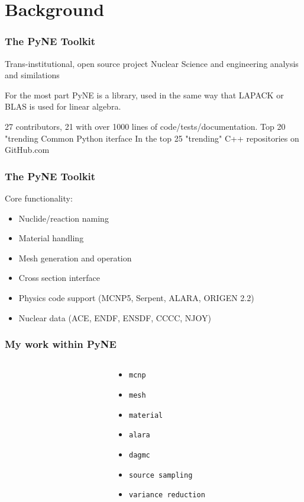\documentclass[12pt]{beamer}
\begin{document}
\section{Background}
\begin{frame}[fragile]
\frametitle{The PyNE Toolkit}

Trans-institutional, open source project
Nuclear Science and engineering analysis and similations

For the most part PyNE is a library, used in the same way that LAPACK or BLAS
is used for linear algebra.

27 contributors, 21 with over 1000 lines of code/tests/documentation.
Top 20 "trending 
Common Python iterface
In the top 25 "trending" C++ repositories on GitHub.com

\end{frame}
\begin{frame}[fragile]
\frametitle{The PyNE Toolkit}

Core functionality:
\begin{itemize}
\item{Nuclide/reaction naming}
\item{Material handling}
\item{Mesh generation and operation}
\item{Cross section interface}
\item{Physics code support (MCNP5, Serpent, ALARA, ORIGEN 2.2)}
\item{Nuclear data (ACE, ENDF, ENSDF, CCCC, NJOY)}
\end{itemize}

\end{frame}
\begin{frame}
\frametitle{My work within PyNE}

\begin{columns}
\begin{column}{0.5\textwidth}
\end{column}
\begin{column}{0.5\textwidth}
\begin{itemize}
\item{\texttt{mcnp}}
\item{\texttt{mesh}}
\item{\texttt{material} }
\item{\texttt{alara}}
\item{\texttt{dagmc}}
\item{\texttt{source sampling}}
\item{\texttt{variance reduction}}
\end{itemize}
\end{column}
\end{columns}



\cite{Biondo2014}

\end{frame}
\end{document}
